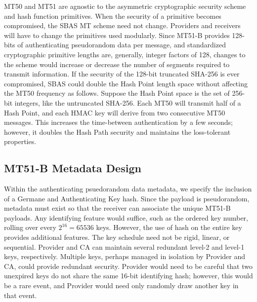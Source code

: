 \documentclass[letterpaper,times]{IONconf/IONconf}
\begin{document}
	MT50 and MT51 are agnostic to the asymmetric cryptographic security scheme and hash function primitives.
	When the security of a primitive becomes compromised, the SBAS MT scheme need not change.
	Providers and receivers will have to change the primitives used modularly.
	Since MT51-B provides 128-bits of authenticating pseudorandom data per message, and standardized cryptographic primitive lengths are, generally, integer factors of 128, changes to the scheme would increase or decrease the number of segments required to transmit information.
	If the security of the 128-bit truncated SHA-256 is ever compromised, SBAS could double the Hash Point length space without affecting the MT50 frequency as follows.
	Suppose the Hash Point space is the set of 256-bit integers, like the untruncated SHA-256.
	Each MT50 will transmit half of a Hash Point, and each HMAC key will derive from two consecutive MT50 messages.
	This increases the time-between authentication by a few seconds; however, it doubles the Hash Path security and maintains the loss-tolerant properties.

	\subsection{MT51-B Metadata Design} \label{sub:metadata_design}

		Within the authenticating psuedorandom data metadata, we specify the inclusion of a Germane and Authenticating Key hash.
		Since the payload is pseudorandom, metadata must exist so that the receiver can associate the unique MT51-B payloads.
		Any identifying feature would suffice, such as the ordered key number, rolling over every $2^{16} = 65536$ keys.
		However, the use of hash on the entire key provides additional features.
		The key schedule need not be rigid, linear, or sequential.
		Provider and CA can maintain several redundant level-2 and level-1 keys, respectively.
		Multiple keys, perhaps managed in isolation by Provider and CA, could provide redundant security.
		Provider would need to be careful that two unexpired keys do not share the same 16-bit identifying hash; however, this would be a rare event, and Provider would need only randomly draw another key in that event.
\end{document}
